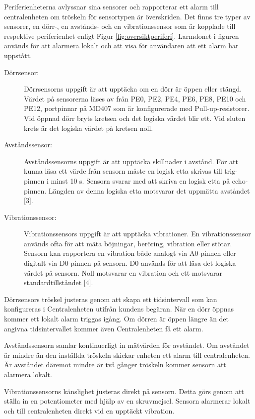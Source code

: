 \documentclass[a4paper]{article}
\begin{document}
Periferienheterna avlyssnar sina sensorer och rapporterar ett alarm till centralenheten om tröskeln för sensortypen är överskriden.
Det finns tre typer av sensorer, en dörr-, en avstånds- och en vibrationssensor som är kopplade till respektive periferienhet enligt Figur \ref{fig:oversiktperiferi}.
Larmdonet i figuren används för att alarmera lokalt och att visa för användaren att ett alarm har uppstått.

\begin{description}
    \item[Dörrsensor:] Dörrsensorns uppgift är att upptäcka om en dörr är öppen eller stängd.
    Värdet på sensorerna läses av från PE0, PE2, PE4, PE6, PE8, PE10 och PE12, portpinnar på MD407 som är konfigurerade med Pull-up-resistorer.
    Vid öppnad dörr bryts kretsen och det logiska värdet blir ett.
    Vid sluten krets är det logiska värdet på kretsen noll.

    \item[Avståndssensor:] Avståndssensorns uppgift är att upptäcka skillnader i avstånd.
    För att kunna läsa ett värde från sensorn måste en logisk etta skrivas till trig-pinnen i minst 10 \textmu s.
    Sensorn svarar med att skriva en logisk etta på echo-pinnen.
    Längden av denna logiska etta motsvarar det uppmätta avståndet [3].

    \item[Vibrationssensor:] Vibrationssensors uppgift är att upptäcka vibrationer.
    En vibrationssensor används ofta för att mäta böjningar, beröring, vibration eller stötar.
    Sensorn kan rapportera en vibration både analogt via A0-pinnen eller digitalt via D0-pinnen på sensorn.
    D0 används för att läsa det logiska värdet på sensorn.
    Noll motsvarar en vibration och ett motsvarar standardtillståndet [4].
\end{description}

Dörrsensors tröskel justeras genom att skapa ett tidsintervall som kan konfigureras i Centralenheten utifrån kundens begäran.
När en dörr öppnas kommer ett lokalt alarm triggas igång.
Om dörren är öppen längre än det angivna tidsintervallet kommer även Centralenheten få ett alarm.

Avståndssensorn samlar kontinuerligt in mätvärden för avståndet.
Om avståndet är mindre än den inställda tröskeln skickar enheten ett alarm till centralenheten.
Är avståndet däremot mindre är två gånger tröskeln kommer sensorn att alarmera lokalt.

Vibrationssensorns känslighet justeras direkt på sensorn.
Detta görs genom att ställa in en potentiometer med hjälp av en skruvmejsel.
Sensorn alarmerar lokalt och till centralenheten direkt vid en upptäckt vibration.
\end{document}
